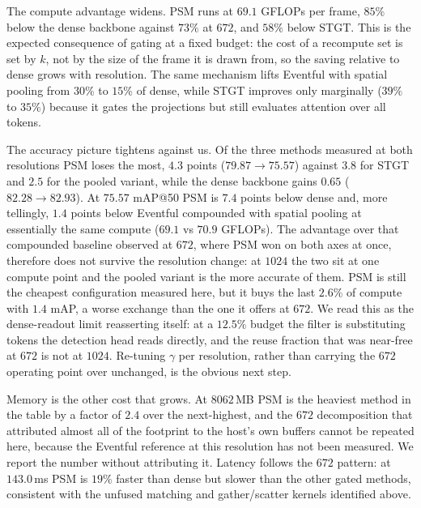 The compute advantage widens. PSM runs at $69.1$ GFLOPs per frame,
$85\%$ below the dense backbone against $73\%$ at $672$, and $58\%$
below STGT. This is the expected consequence of gating at a fixed
budget: the cost of a recompute set is set by $k$, not by the size of
the frame it is drawn from, so the saving relative to dense grows with
resolution. The same mechanism lifts Eventful with spatial pooling from
$30\%$ to $15\%$ of dense, while STGT improves only marginally
($39\%$ to $35\%$) because it gates the projections but still evaluates
attention over all tokens.

The accuracy picture tightens against us. Of the three methods measured
at both resolutions PSM loses the most, $4.3$ points
($79.87 \rightarrow 75.57$) against $3.8$ for STGT and $2.5$ for the
pooled variant, while the dense backbone gains $0.65$
($82.28 \rightarrow 82.93$). At $75.57$ mAP@50 PSM is $7.4$ points below
dense and, more tellingly, $1.4$ points below Eventful compounded with
spatial pooling at essentially the same compute ($69.1$ vs $70.9$
GFLOPs). The advantage over that compounded baseline observed at $672$,
where PSM won on both axes at once, therefore does not survive the
resolution change: at $1024$ the two sit at one compute point and the
pooled variant is the more accurate of them. PSM is still the cheapest
configuration measured here, but it buys the last $2.6\%$ of compute
with $1.4$ mAP, a worse exchange than the one it offers at $672$. We
read this as the dense-readout limit reasserting itself: at a $12.5\%$
budget the filter is substituting tokens the detection head reads
directly, and the reuse fraction that was near-free at $672$ is not at
$1024$. Re-tuning $\gamma$ per resolution, rather than carrying the
$672$ operating point over unchanged, is the obvious next step.

Memory is the other cost that grows. At $8062$\,MB PSM is the heaviest
method in the table by a factor of $2.4$ over the next-highest, and the
$672$ decomposition that attributed almost all of the footprint to the
host's own buffers cannot be repeated here, because the Eventful
reference at this resolution has not been measured. We report the number
without attributing it. Latency follows the $672$ pattern: at
$143.0$\,ms PSM is $19\%$ faster than dense but slower than the other
gated methods, consistent with the unfused matching and gather/scatter
kernels identified above.

